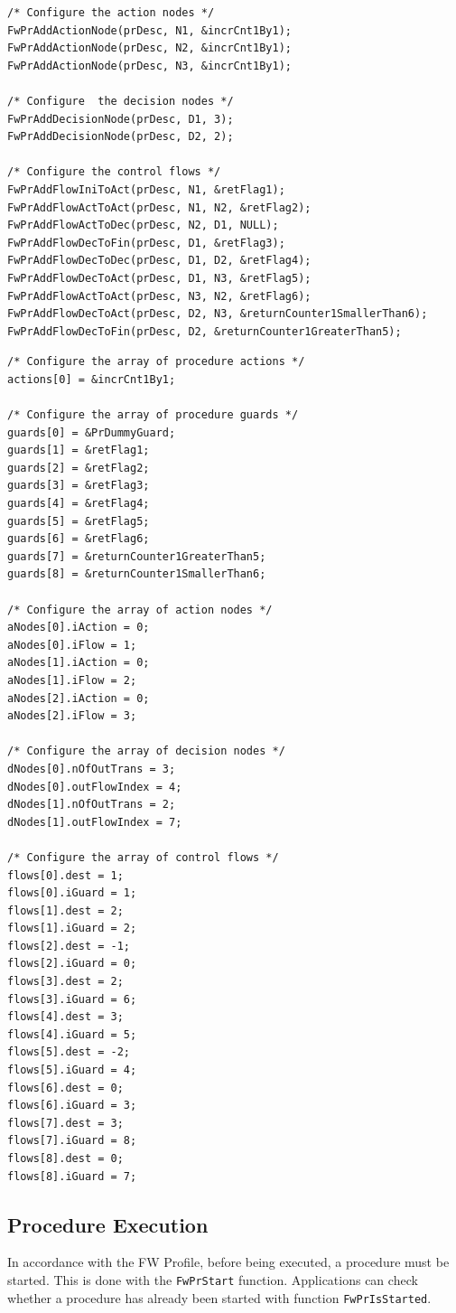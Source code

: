 \documentclass[manual]{../fwprofile}
\begin{document}
\begin{lstlisting}
/* Configure the action nodes */
FwPrAddActionNode(prDesc, N1, &incrCnt1By1);
FwPrAddActionNode(prDesc, N2, &incrCnt1By1);
FwPrAddActionNode(prDesc, N3, &incrCnt1By1);

/* Configure  the decision nodes */
FwPrAddDecisionNode(prDesc, D1, 3);
FwPrAddDecisionNode(prDesc, D2, 2);

/* Configure the control flows */
FwPrAddFlowIniToAct(prDesc, N1, &retFlag1);
FwPrAddFlowActToAct(prDesc, N1, N2, &retFlag2);
FwPrAddFlowActToDec(prDesc, N2, D1, NULL);
FwPrAddFlowDecToFin(prDesc, D1, &retFlag3);
FwPrAddFlowDecToDec(prDesc, D1, D2, &retFlag4);
FwPrAddFlowDecToAct(prDesc, D1, N3, &retFlag5);
FwPrAddFlowActToAct(prDesc, N3, N2, &retFlag6);
FwPrAddFlowDecToAct(prDesc, D2, N3, &returnCounter1SmallerThan6);
FwPrAddFlowDecToFin(prDesc, D2, &returnCounter1GreaterThan5);
\end{lstlisting}


\begin{lstlisting}
/* Configure the array of procedure actions */
actions[0] = &incrCnt1By1;

/* Configure the array of procedure guards */
guards[0] = &PrDummyGuard;
guards[1] = &retFlag1;
guards[2] = &retFlag2;
guards[3] = &retFlag3;
guards[4] = &retFlag4;
guards[5] = &retFlag5;
guards[6] = &retFlag6;
guards[7] = &returnCounter1GreaterThan5;
guards[8] = &returnCounter1SmallerThan6;

/* Configure the array of action nodes */
aNodes[0].iAction = 0;
aNodes[0].iFlow = 1;
aNodes[1].iAction = 0;
aNodes[1].iFlow = 2;
aNodes[2].iAction = 0;
aNodes[2].iFlow = 3;

/* Configure the array of decision nodes */
dNodes[0].nOfOutTrans = 3;
dNodes[0].outFlowIndex = 4;
dNodes[1].nOfOutTrans = 2;
dNodes[1].outFlowIndex = 7;

/* Configure the array of control flows */
flows[0].dest = 1;
flows[0].iGuard = 1;
flows[1].dest = 2;
flows[1].iGuard = 2;
flows[2].dest = -1;
flows[2].iGuard = 0;
flows[3].dest = 2;
flows[3].iGuard = 6;
flows[4].dest = 3;
flows[4].iGuard = 5;
flows[5].dest = -2;
flows[5].iGuard = 4;
flows[6].dest = 0;
flows[6].iGuard = 3;
flows[7].dest = 3;
flows[7].iGuard = 8;
flows[8].dest = 0;
flows[8].iGuard = 7;
\end{lstlisting}

\subsection{Procedure Execution}\label{sec:PrExecution}
In accordance with the FW Profile, 
before being executed, a procedure must be started. This is done with the \texttt{FwPrStart} function. Applications 
can check whether a procedure has already been started with function \texttt{FwPrIsStarted}.
\end{document}
